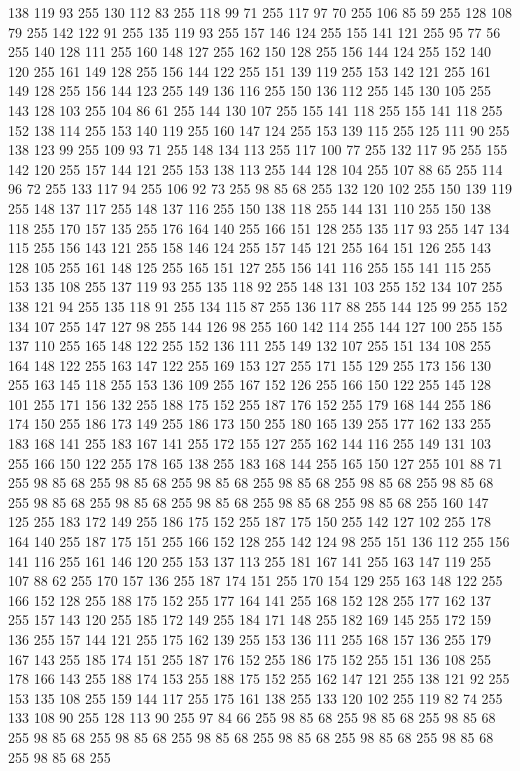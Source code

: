 138 119 93 255 130 112 83 255 118 99 71 255 117 97 70 255 106 85 59 255 128 108 79 255 142 122 91 255 135 119 93 255 157 146 124 255 155 141 121 255 95 77 56 255 140 128 111 255 160 148 127 255 162 150 128 255 156 144 124 255 152 140 120 255 161 149 128 255 156 144 122 255 151 139 119 255 153 142 121 255 161 149 128 255 156 144 123 255 149 136 116 255 150 136 112 255 145 130 105 255 143 128 103 255 104 86 61 255 144 130 107 255 155 141 118 255 155 141 118 255 152 138 114 255 153 140 119 255 160 147 124 255 153 139 115 255 125 111 90 255 138 123 99 255 109 93 71 255 148 134 113 255 117 100 77 255 132 117 95 255 155 142 120 255 157 144 121 255 153 138 113 255 144 128 104 255 107 88 65 255 114 96 72 255 133 117 94 255 106 92 73 255 98 85 68 255 132 120 102 255 150 139 119 255 148 137 117 255 148 137 116 255 150 138 118 255 144 131 110 255 150 138 118 255 170 157 135 255 176 164 140 255 166 151 128 255 135 117 93 255 147 134 115 255 156 143 121 255 158 146 124 255 157 145 121 255
164 151 126 255 143 128 105 255 161 148 125 255 165 151 127 255 156 141 116 255 155 141 115 255 153 135 108 255 137 119 93 255 135 118 92 255 148 131 103 255 152 134 107 255 138 121 94 255 135 118 91 255 134 115 87 255 136 117 88 255 144 125 99 255 152 134 107 255 147 127 98 255 144 126 98 255 160 142 114 255 144 127 100 255 155 137 110 255 165 148 122 255 152 136 111 255 149 132 107 255 151 134 108 255 164 148 122 255 163 147 122 255 169 153 127 255 171 155 129 255 173 156 130 255 163 145 118 255 153 136 109 255 167 152 126 255 166 150 122 255 145 128 101 255 171 156 132 255 188 175 152 255 187 176 152 255 179 168 144 255 186 174 150 255 186 173 149 255 186 173 150 255 180 165 139 255 177 162 133 255 183 168 141 255 183 167 141 255 172 155 127 255 162 144 116 255 149 131 103 255 166 150 122 255 178 165 138 255 183 168 144 255 165 150 127 255 101 88 71 255 98 85 68 255 98 85 68 255 98 85 68 255 98 85 68 255 98 85 68 255 98 85 68 255 98 85 68 255 98 85 68 255 98 85 68 255
98 85 68 255 98 85 68 255 160 147 125 255 183 172 149 255 186 175 152 255 187 175 150 255 142 127 102 255 178 164 140 255 187 175 151 255 166 152 128 255 142 124 98 255 151 136 112 255 156 141 116 255 161 146 120 255 153 137 113 255 181 167 141 255 163 147 119 255 107 88 62 255 170 157 136 255 187 174 151 255 170 154 129 255 163 148 122 255 166 152 128 255 188 175 152 255 177 164 141 255 168 152 128 255 177 162 137 255 157 143 120 255 185 172 149 255 184 171 148 255 182 169 145 255 172 159 136 255 157 144 121 255 175 162 139 255 153 136 111 255 168 157 136 255 179 167 143 255 185 174 151 255 187 176 152 255 186 175 152 255 151 136 108 255 178 166 143 255 188 174 153 255 188 175 152 255 162 147 121 255 138 121 92 255 153 135 108 255 159 144 117 255 175 161 138 255 133 120 102 255 119 82 74 255 133 108 90 255 128 113 90 255 97 84 66 255 98 85 68 255 98 85 68 255 98 85 68 255 98 85 68 255 98 85 68 255 98 85 68 255 98 85 68 255 98 85 68 255 98 85 68 255 98 85 68 255
